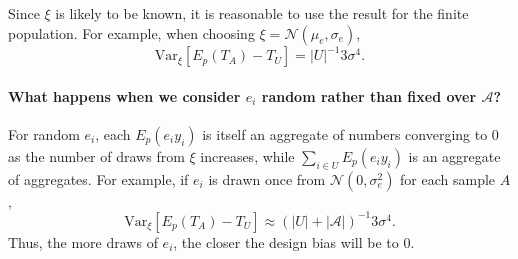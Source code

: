 \documentclass{article}
\begin{document}
Since $\xi$ is likely to be known, it is reasonable to use the result for the finite population. For example, when choosing $\xi = \mathcal{N}(\mu_e, \sigma_e)$, 
$$
\text{Var}_\xi[E_p(T_A) - T_U] = |U|^{-1} 3 \sigma^4.
$$

\paragraph{What happens when we consider $e_i$ random rather than fixed over $\mathcal{A}$?}

For random $e_i$, each $E_p \left(e_i y_i\right)$ is itself an aggregate of numbers converging to 0 as the number of draws from $\xi$ increases, while $\sum_{i \in U} E_p \left(e_i y_i\right)$ is an aggregate of aggregates. For example, if $e_i$ is drawn once from $\mathcal{N}(0, \sigma_e^2)$ for each sample $A$, 
$$
\text{Var}_\xi[E_p(T_A) - T_U] \approx (|U| + |\mathcal{A}|)^{-1} 3 \sigma^4.
$$
Thus, the more draws of $e_i$, the closer the design bias will be to 0.




	
\end{document}
